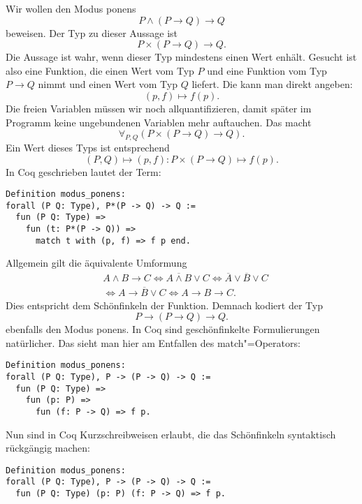 \documentclass[a4paper,10pt,fleqn,twocolumn,twoside,dvipdfmx]{scrartcl}
\numberwithin{equation}{section}
\begin{document}
Wir wollen den Modus ponens%
\begin{equation}
P\land (P\rightarrow Q)\rightarrow Q
\end{equation}
beweisen. Der Typ zu dieser Aussage ist%
\begin{equation}
P\times (P\rightarrow Q)\rightarrow Q.
\end{equation}
Die Aussage ist wahr, wenn dieser Typ mindestens einen Wert enhält.
Gesucht ist also eine Funktion, die einen Wert vom Typ $P$ und
eine Funktion vom Typ $P\rightarrow Q$ nimmt und einen Wert vom
Typ $Q$ liefert. Die kann man direkt angeben:%
\begin{equation}
(p, f)\mapsto f(p).
\end{equation}
Die freien Variablen müssen wir noch allquantifizieren, damit später
im Programm keine ungebundenen Variablen mehr auftauchen. Das macht%
\begin{equation}
\forall_{P, Q}(P\times (P\to Q)\to Q).
\end{equation}
Ein Wert dieses Typs ist entsprechend%
\begin{equation}
(P, Q) \mapsto (p, f)\colon P\times (P\to Q)\mapsto f(p).
\end{equation}
In Coq geschrieben lautet der Term:%
\begin{lstlisting}[language=Coq]
Definition modus_ponens:
forall (P Q: Type), P*(P -> Q) -> Q :=
  fun (P Q: Type) =>
    fun (t: P*(P -> Q)) =>
      match t with (p, f) => f p end.
\end{lstlisting}
Allgemein gilt die äquivalente Umformung%
\begin{equation}
\begin{aligned}
& A\land B\to C \iff \overline{A\land B}\lor C
\iff\overline A\lor\overline B\lor C\\
&\iff A\to \overline B\lor C
\iff A\to B\to C.
\end{aligned}
\end{equation}
Dies entspricht dem Schönfinkeln der Funktion. Demnach kodiert
der Typ%
\begin{equation}
P\to (P\to Q)\to Q.
\end{equation}
ebenfalls den Modus ponens. In Coq sind geschönfinkelte Formulierungen
natürlicher. Das sieht man hier am Entfallen des match"=Operators:%
\begin{lstlisting}[language=Coq]
Definition modus_ponens:
forall (P Q: Type), P -> (P -> Q) -> Q :=
  fun (P Q: Type) =>
    fun (p: P) =>
      fun (f: P -> Q) => f p.
\end{lstlisting}
Nun sind in Coq Kurzschreibweisen erlaubt, die das Schönfinkeln
syntaktisch rückgängig machen:%
\begin{lstlisting}[language=Coq]
Definition modus_ponens:
forall (P Q: Type), P -> (P -> Q) -> Q :=
  fun (P Q: Type) (p: P) (f: P -> Q) => f p.
\end{lstlisting}
\end{document}
